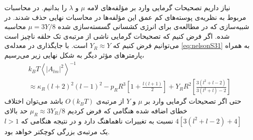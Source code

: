 نیاز داریم تصحیحات گرمایی وارد بر مؤلفه‌های لامه $\mu$
و $\lambda$ 
را بدانیم. در محاسبات مربوط به نظریه‌ی پوسته‌های کم عمق این مؤلفه‌ها در محاسبات نهایی حذف شدند. در شبیه‌سازی که در مطالعه‌ی 
\cite{gomppernelson2012}
برای انرژی کشسانی گسسته‌سازی شده $\mu=3Y/8$
محاسبه شده. اگر فرض کنیم که تصحیحات گرمایی ناشی از مرتبه‌ی تک حلقه ناچیز است می‌توانیم فرض کنیم که $Y_R\approx Y$ 
است. با جایگذاری در معدله‌ی \ref{eq:nelsonS31} به همراه پارمتر‌های مؤثر دیگر به شکل نهایی زیر می‌رسیم،
\begin{equation}
\begin{aligned}
&k_BT\left\langle|A_{lm}|^2\right\rangle^{-1}\\
&\approx\kappa_R(l+2)^2(l-1)^2-p_RR^3\left[1+\frac{l(l+1)}{2}\right]+Y_RR^2\left[\frac{3(l^2+l-2)}{3(l^2+l)-2}\right]
\label{eq:nelsonS32}
\end{aligned}
\end{equation} 
حتی اگر تصحیحات گرمایی وارد بر $\mu$
و $Y$
از مرتبه‌ی $O(k_BT)$ 
باشد می‌توان اختلاف خطای اضافه شده هنگامی که فرض کردیم $\mu_R\approx3Y_R/8$
حد بالای 
$4[3(l^2+l-2)+4]$
نسبت به تغییرات ناهماهنگ دارد و در نتیجه هنگامی که $l>1$
یک مرتبه‌ی بزرگی کوچکتر خواهد بود.


% 
%


	        
	       